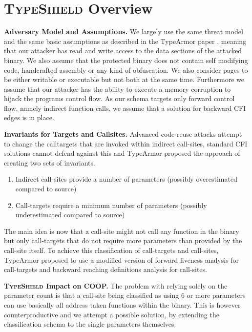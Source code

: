 \section{\textsc{TypeShield} Overview}
\label{chapter:TypeShild Overview}

\textbf{Adversary Model and Assumptions.}
\label{Adversary Model}
We largely use the same threat model and the same basic assumptions as described in the TypeArmor 
paper \cite{veen:typearmor}, meaning that our attacker has read and write access to the data 
sections of the attacked binary.  We also assume that the protected binary does not contain 
self modifying code, handcrafted assembly or any kind of obfuscation. We also consider pages 
to be either writable or executable but not both at the same time. Furthermore we assume 
that our attacker has the ability to execute a memory corruption to hijack the programs 
control flow. As our schema targets only forward control flow, namely indirect function 
calls, we assume that a solution for backward CFI edges is in place.

\textbf{Invariants for Targets and Callsites.}
\label{Invariants for Targets and Callsites}
Advanced code reuse attacks attempt to change the calltargets that are invoked within indirect 
call-sites, standard CFI solutions cannot defend against this and TypeArmor proposed the approach
of creating two sets of invariants. 

\begin{enumerate}
\item Indirect call-sites provide a number of parameters (possibly overestimated compared to source)
\item Call-targets require a minimum number of parameters (possibly underestimated compared to source)
\end{enumerate}

The main idea is now that a call-site might not call any function in the binary but only call-targets
that do not require more parameters than provided by the call-site itself. To achieve this classification
of call-targets and call-sites, TypeArmor proposed to use a modified version of forward liveness analysis
for call-targets and backward reaching definitions analysis for call-sites.


\textbf{\textsc{TypeShield} Impact on COOP.}
\label{TypeShild Impact on COOP}
The problem with relying solely on the parameter count is that a call-site being classified as using
6 or more parameters can use basically all address taken functions within the binary. This is however
counterproductive and we attempt a possible solution, by extending the classification schema to the
single parameters themselves:


